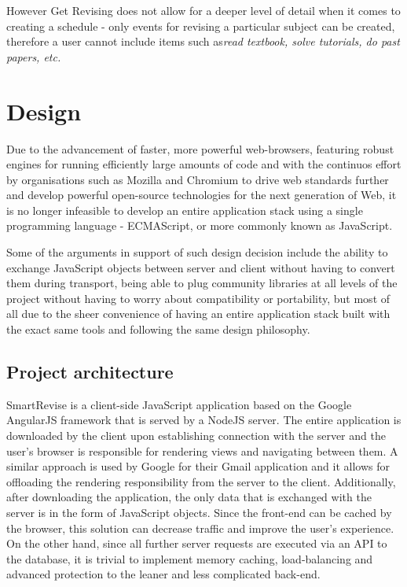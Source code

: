 \documentclass[bsc,frontabs,twoside,singlespacing,parskip]{infthesis}     %
\begin{document}
	However Get Revising does not allow for a deeper level of detail when it comes to creating a schedule - only events for revising a particular subject can be created, therefore a user cannot include items such as\textit{read textbook, solve tutorials, do past papers, etc.}
	
	



\chapter{Design}

	Due to the advancement of faster, more powerful web-browsers, featuring robust engines for running efficiently large amounts of  code and with the continuos effort by organisations such as Mozilla and Chromium to drive web standards further and develop powerful open-source technologies for the next generation of Web, it is no longer infeasible to develop an entire application stack using a single programming language - ECMAScript, or more commonly known as JavaScript.
	
	Some of the arguments in support of such design decision include the ability to exchange JavaScript objects between server and client without having to convert them during transport, being able to plug community libraries at all levels of the project without having to worry about compatibility or portability, but most of all due to the sheer convenience of having an entire application stack built with the exact same tools and following the same design philosophy. 

	\section{Project architecture}
	
	SmartRevise is a client-side JavaScript application based on the Google AngularJS framework that is served by a NodeJS server. The entire application is downloaded by the client upon establishing connection with the server and the user's browser is responsible for rendering views and navigating between them. A similar approach is used by Google for their Gmail application and it allows for offloading the rendering responsibility from the server to the client. Additionally, after downloading the application, the only data that is exchanged with the server is in the form of JavaScript objects. Since the front-end can be cached by the browser, this solution can decrease traffic and improve the user's experience. On the other hand, since all further server requests are executed via an API to the database, it is trivial to implement memory caching, load-balancing and advanced protection to the leaner and less complicated back-end.
	
\end{document}
